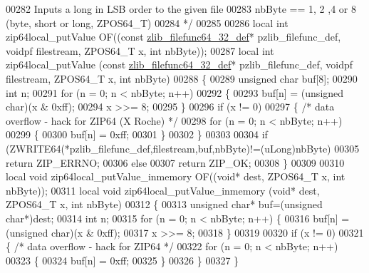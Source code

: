 \begin{DoxyCode}
00282 \textcolor{comment}{   Inputs a long in LSB order to the given file}
00283 \textcolor{comment}{   nbByte == 1, 2 ,4 or 8 (byte, short or long, ZPOS64\_T)}
00284 \textcolor{comment}{*/}
00285 
00286 local \textcolor{keywordtype}{int} zip64local\_putValue OF((\textcolor{keyword}{const} \hyperlink{structzlib__filefunc64__32__def__s}{zlib\_filefunc64\_32\_def}* pzlib\_filefunc\_def, 
      voidpf filestream, ZPOS64\_T x, \textcolor{keywordtype}{int} nbByte));
00287 local \textcolor{keywordtype}{int} zip64local\_putValue (\textcolor{keyword}{const} \hyperlink{structzlib__filefunc64__32__def__s}{zlib\_filefunc64\_32\_def}* pzlib\_filefunc\_def, 
      voidpf filestream, ZPOS64\_T x, \textcolor{keywordtype}{int} nbByte)
00288 \{
00289     \textcolor{keywordtype}{unsigned} \textcolor{keywordtype}{char} buf[8];
00290     \textcolor{keywordtype}{int} n;
00291     \textcolor{keywordflow}{for} (n = 0; n < nbByte; n++)
00292     \{
00293         buf[n] = (\textcolor{keywordtype}{unsigned} char)(x & 0xff);
00294         x >>= 8;
00295     \}
00296     \textcolor{keywordflow}{if} (x != 0)
00297       \{     \textcolor{comment}{/* data overflow - hack for ZIP64 (X Roche) */}
00298       \textcolor{keywordflow}{for} (n = 0; n < nbByte; n++)
00299         \{
00300           buf[n] = 0xff;
00301         \}
00302       \}
00303 
00304     \textcolor{keywordflow}{if} (ZWRITE64(*pzlib\_filefunc\_def,filestream,buf,nbByte)!=(uLong)nbByte)
00305         \textcolor{keywordflow}{return} ZIP\_ERRNO;
00306     \textcolor{keywordflow}{else}
00307         \textcolor{keywordflow}{return} ZIP\_OK;
00308 \}
00309 
00310 local \textcolor{keywordtype}{void} zip64local\_putValue\_inmemory OF((\textcolor{keywordtype}{void}* dest, ZPOS64\_T x, \textcolor{keywordtype}{int} nbByte));
00311 local \textcolor{keywordtype}{void} zip64local\_putValue\_inmemory (\textcolor{keywordtype}{void}* dest, ZPOS64\_T x, \textcolor{keywordtype}{int} nbByte)
00312 \{
00313     \textcolor{keywordtype}{unsigned} \textcolor{keywordtype}{char}* buf=(\textcolor{keywordtype}{unsigned} \textcolor{keywordtype}{char}*)dest;
00314     \textcolor{keywordtype}{int} n;
00315     \textcolor{keywordflow}{for} (n = 0; n < nbByte; n++) \{
00316         buf[n] = (\textcolor{keywordtype}{unsigned} char)(x & 0xff);
00317         x >>= 8;
00318     \}
00319 
00320     \textcolor{keywordflow}{if} (x != 0)
00321     \{     \textcolor{comment}{/* data overflow - hack for ZIP64 */}
00322        \textcolor{keywordflow}{for} (n = 0; n < nbByte; n++)
00323        \{
00324           buf[n] = 0xff;
00325        \}
00326     \}
00327 \}

\end{DoxyCode}
